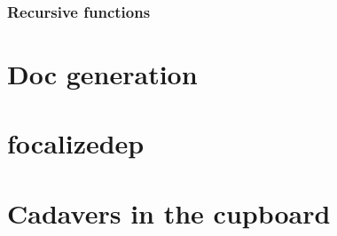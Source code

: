 \documentclass{book}
\begin{document}
\subsection{Recursive functions}

\chapter{Doc generation}

\chapter{focalizedep}

\chapter{Cadavers in the cupboard}


\printindex
\end{document}
